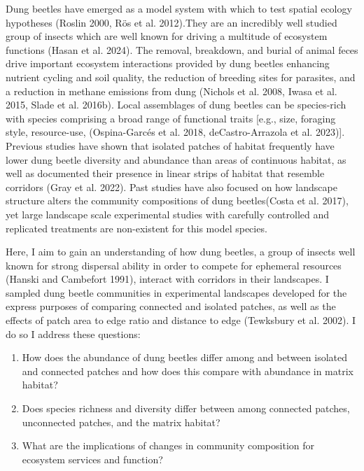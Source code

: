 \documentclass[
  man, donotrepeattitle]{apa6}
\providecommand{\tightlist}{%
  \setlength{\itemsep}{0pt}\setlength{\parskip}{0pt}}
\begin{document}
Dung beetles have emerged as a model system with which to test spatial ecology hypotheses (Roslin 2000, Rös et al. 2012).They are an incredibly well studied group of insects which are well known for driving a multitude of ecosystem functions (Hasan et al. 2024). The removal, breakdown, and burial of animal feces drive important ecosystem interactions provided by dung beetles enhancing nutrient cycling and soil quality, the reduction of breeding sites for parasites, and a reduction in methane emissions from dung (Nichols et al. 2008, Iwasa et al. 2015, Slade et al. 2016b). Local assemblages of dung beetles can be species-rich with species comprising a broad range of functional traits {[}e.g., size, foraging style, resource-use, (Ospina-Garcés et al. 2018, deCastro-Arrazola et al. 2023){]}. Previous studies have shown that isolated patches of habitat frequently have lower dung beetle diversity and abundance than areas of continuous habitat, as well as documented their presence in linear strips of habitat that resemble corridors (Gray et al. 2022). Past studies have also focused on how landscape structure alters the community compositions of dung beetles(Costa et al. 2017), yet large landscape scale experimental studies with carefully controlled and replicated treatments are non-existent for this model species.

Here, I aim to gain an understanding of how dung beetles, a group of insects well known for strong dispersal ability in order to compete for ephemeral resources (Hanski and Cambefort 1991), interact with corridors in their landscapes. I sampled dung beetle communities in experimental landscapes developed for the express purposes of comparing connected and isolated patches, as well as the effects of patch area to edge ratio and distance to edge (Tewksbury et al. 2002). I do so I address these questions:

\begin{enumerate}
\def\labelenumi{(\arabic{enumi})}
\tightlist
\item
  How does the abundance of dung beetles differ among and between isolated and connected patches and how does this compare with abundance in matrix habitat?
\item
  Does species richness and diversity differ between among connected patches, unconnected patches, and the matrix habitat?
\item
  What are the implications of changes in community composition for ecosystem services and function?
\end{enumerate}
\end{document}
